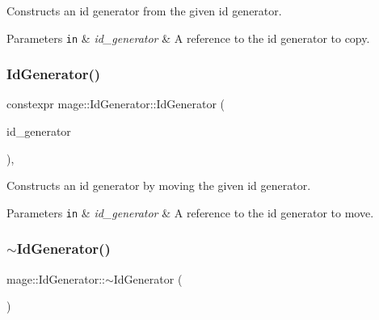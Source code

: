 Constructs an id generator from the given id generator.


\begin{DoxyParams}[1]{Parameters}
\mbox{\tt in}  & {\em id\+\_\+generator} & A reference to the id generator to copy. \\
\hline
\end{DoxyParams}
\hypertarget{classmage_1_1_id_generator_a41ff4257bf42f434235f2d092c3b197d}{}\label{classmage_1_1_id_generator_a41ff4257bf42f434235f2d092c3b197d} 
\subsubsection{\texorpdfstring{Id\+Generator()}{IdGenerator()}\hspace{0.1cm}{\footnotesize\ttfamily [3/3]}}
{\footnotesize\ttfamily constexpr mage\+::\+Id\+Generator\+::\+Id\+Generator (\begin{DoxyParamCaption}\item[{\hyperlink{classmage_1_1_id_generator}{Id\+Generator} \&\&}]{id\+\_\+generator }\end{DoxyParamCaption})\hspace{0.3cm}{\ttfamily [default]}, {\ttfamily [noexcept]}}

Constructs an id generator by moving the given id generator.


\begin{DoxyParams}[1]{Parameters}
\mbox{\tt in}  & {\em id\+\_\+generator} & A reference to the id generator to move. \\
\hline
\end{DoxyParams}
\hypertarget{classmage_1_1_id_generator_a70161ab5b10294ebba1ace7a3b0f8d31}{}\label{classmage_1_1_id_generator_a70161ab5b10294ebba1ace7a3b0f8d31} 
\subsubsection{\texorpdfstring{$\sim$\+Id\+Generator()}{~IdGenerator()}}
{\footnotesize\ttfamily mage\+::\+Id\+Generator\+::$\sim$\+Id\+Generator (\begin{DoxyParamCaption}{ }\end{DoxyParamCaption})\hspace{0.3cm}{\ttfamily [default]}}

